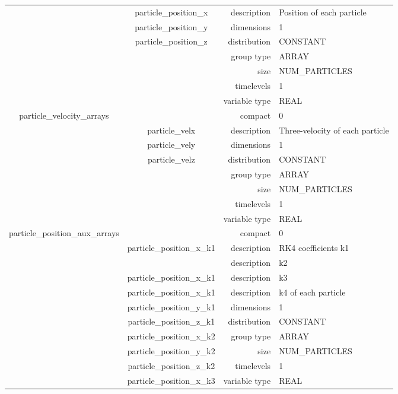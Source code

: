 \begin{tabular*}{150mm}{|c|c@{\extracolsep{\fill}}|rl|}
 & particle\_position\_x & description & Position of each particle \\ 
 & particle\_position\_y & dimensions & 1 \\ 
 & particle\_position\_z & distribution & CONSTANT \\ 
 &  & group type & ARRAY \\ 
 &  & size & NUM\_PARTICLES \\ 
 &  & timelevels & 1 \\ 
 &  & variable type & REAL \\ 
\hline 
particle\_velocity\_arrays &  & compact & 0 \\ 
 & particle\_velx & description & Three-velocity of each particle \\ 
 & particle\_vely & dimensions & 1 \\ 
 & particle\_velz & distribution & CONSTANT \\ 
 &  & group type & ARRAY \\ 
 &  & size & NUM\_PARTICLES \\ 
 &  & timelevels & 1 \\ 
 &  & variable type & REAL \\ 
\hline 
particle\_position\_aux\_arrays &  & compact & 0 \\ 
 & particle\_position\_x\_k1 & description & RK4 coefficients k1 \\ 
& ~ & description & k2 \\ 
 & particle\_position\_x\_k1 & description & k3 \\ 
 & particle\_position\_x\_k1 & description & k4 of each particle \\ 
 & particle\_position\_y\_k1 & dimensions & 1 \\ 
 & particle\_position\_z\_k1 & distribution & CONSTANT \\ 
 & particle\_position\_x\_k2 & group type & ARRAY \\ 
 & particle\_position\_y\_k2 & size & NUM\_PARTICLES \\ 
 & particle\_position\_z\_k2 & timelevels & 1 \\ 
 & particle\_position\_x\_k3 & variable type & REAL \\ 
\hline 
\end{tabular*} 



\vspace{5mm}
\vspace{5mm}

